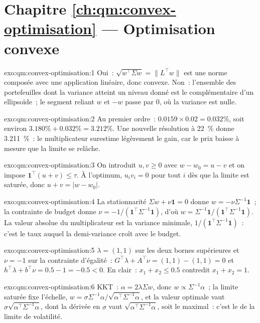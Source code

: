 \section*{Chapitre \ref{ch:qm:convex-optimisation} --- Optimisation convexe}

\begin{solution}{exo:qm:convex-optimisation:1}
Oui~: $\sqrt{w^\top\Sigma w} = \lVert L^\top w\rVert$ est une norme composée avec une application linéaire, donc convexe. Non~: l'ensemble des portefeuilles dont la variance atteint un niveau donné est le complémentaire d'un ellipsoïde~; le
segment reliant $w$ et $-w$ passe par $0$, où la variance est nulle.
\end{solution}

\begin{solution}{exo:qm:convex-optimisation:2}
Au premier ordre~: $0.0159 \times 0.02 = 0.032\%$, soit environ $3.180\% + 0.032\% = 3.212\%$. Une nouvelle résolution à 22~\% donne 3.211~\%~: le multiplicateur surestime légèrement le gain, car le prix baisse à mesure que la
limite se relâche.
\end{solution}

\begin{solution}{exo:qm:convex-optimisation:3}
On introduit $u, v \ge 0$ avec $w - w_0 = u - v$ et on impose $\mathbf 1^\top(u + v) \le \tau$. À l'optimum, $u_iv_i = 0$ pour tout $i$ dès que la limite est saturée, donc $u + v = |w - w_0|$.
\end{solution}

\begin{solution}{exo:qm:convex-optimisation:4}
La stationnarité $\Sigma w + \nu\mathbf 1 = 0$ donne $w = -\nu\Sigma^{-1}\mathbf 1$~; la contrainte de budget donne $\nu = -1/(\mathbf 1^\top\Sigma^{-1}\mathbf 1)$, d'où $w = \Sigma^{-1}\mathbf 1/(\mathbf 1^\top\Sigma^{-1}\mathbf 1)$.
La valeur absolue du multiplicateur est la variance minimale, $1/(\mathbf 1^\top\Sigma^{-1}\mathbf 1)$~: c'est le taux auquel la demi-variance croît avec le budget.
\end{solution}

\begin{solution}{exo:qm:convex-optimisation:5}
$\lambda = (1, 1)$ sur les deux bornes supérieures et $\nu = -1$ sur la contrainte d'égalité~: $G^\top\lambda + A^\top\nu = (1, 1) - (1, 1) = 0$ et $h^\top\lambda + b^\top\nu = 0.5 - 1 = -0.5 < 0$. En clair~: $x_1 + x_2 \le 0.5$
contredit $x_1 + x_2 = 1$.
\end{solution}

\begin{solution}{exo:qm:convex-optimisation:6}
KKT~: $\alpha = 2\lambda\Sigma w$, donc $w \propto \Sigma^{-1}\alpha$~; la limite saturée fixe l'échelle, $w = \sigma\Sigma^{-1}\alpha/\sqrt{\alpha^\top\Sigma^{-1}\alpha}$, et la valeur optimale vaut $\sigma\sqrt{\alpha^\top\Sigma^{-1}\alpha}$,
dont la dérivée en $\sigma$ vaut $\sqrt{\alpha^\top\Sigma^{-1}\alpha}$, soit le  maximal~: c'est le  de la limite de volatilité.
\end{solution}

